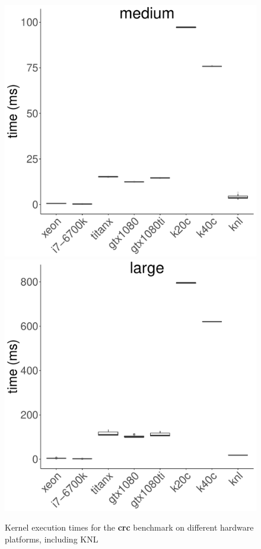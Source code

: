 \documentclass[../document.tex]{subfiles}
\begin{document}
\begin{figure}[t]
	\includegraphics[width=\plotwidth]{figures/time-results/generate_crc_medium_boxplot_knl-1}
	\includegraphics[width=\plotwidth]{figures/time-results/generate_crc_large_boxplot_knl-1}
	\caption{Kernel execution times for the {\bf crc} benchmark on different hardware platforms, including KNL}
	\label{fig:time-crc}
\end{figure}
\end{document}
